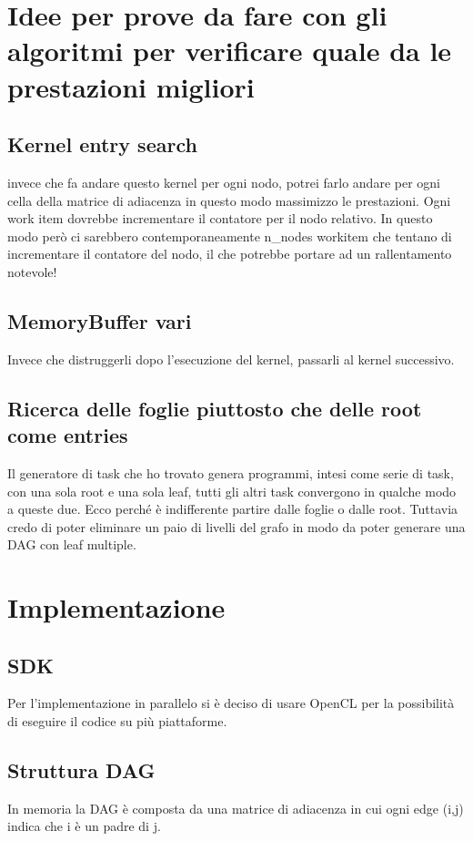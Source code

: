 \documentclass{article}
\begin{document}
    \section{Idee per prove da fare con gli algoritmi per verificare quale da le prestazioni migliori}
        \subsection{Kernel entry search}
            invece che fa andare questo kernel per ogni nodo, potrei farlo andare per ogni cella della matrice di adiacenza in questo modo massimizzo le prestazioni. 
            Ogni work item dovrebbe incrementare il contatore per il nodo relativo. 
            In questo modo però ci sarebbero contemporaneamente n\_nodes workitem che tentano di incrementare il contatore del nodo, il che potrebbe portare ad un rallentamento notevole!
        \subsection{MemoryBuffer vari}
            Invece che distruggerli dopo l'esecuzione del kernel, passarli al kernel successivo.
        \subsection{Ricerca delle foglie piuttosto che delle root come entries}
            Il generatore di task che ho trovato genera programmi, intesi come serie di task, con una sola root e una sola leaf, tutti gli altri task convergono in qualche modo a queste due.
            Ecco perché è indifferente partire dalle foglie o dalle root.
            Tuttavia credo di poter eliminare un paio di livelli del grafo in modo da poter generare una DAG con leaf multiple.

    \section{Implementazione}
        \subsection{SDK}
            Per l'implementazione in parallelo si è deciso di usare OpenCL per la possibilità di eseguire il codice su più piattaforme.
        \subsection{Struttura DAG}
            In memoria la DAG è composta da una matrice di adiacenza in cui ogni edge (i,j) indica che i è un padre di j.
            
\end{document}
